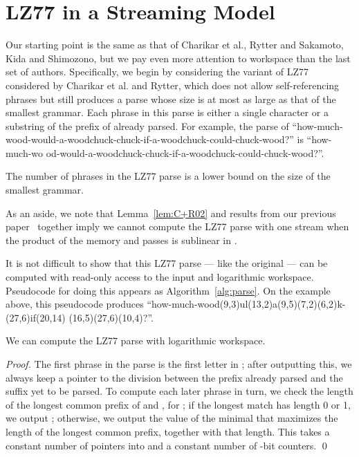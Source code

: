 \documentclass[runningheads]{llncs}
\begin{document}
\section{LZ77 in a Streaming Model} \label{sec:LZ77}

Our starting point is the same as that of Charikar et al., Rytter and Sakamoto, Kida and Shimozono, but we pay even more attention to workspace than the last set of authors.  Specifically, we begin by considering the variant of LZ77 considered by Charikar et al. and Rytter, which does not allow self-referencing phrases but still produces a parse whose size is at most as large as that of the smallest grammar.  Each phrase in this parse is either a single character or a substring of the prefix of  already parsed.  For example, the parse of ``{\sf how-much-wood-would-a-woodchuck-chuck-if-a-woodchuck-could-chuck-wood?}'' is ``{\sf how-much-wo
\linebreak
od-would-a-woodchuck-chuck-if-a-woodchuck-could-chuck-wood?}''.

\begin{lemma} \label{lem:C+R02}
The number of phrases in the LZ77 parse is a lower bound on the size of the smallest grammar.
\end{lemma}

\noindent As an aside, we note that Lemma~\ref{lem:C+R02} and results from our previous paper~\cite{Gag09} together imply we cannot compute the LZ77 parse with one stream when the product of the memory and passes is sublinear in .

It is not difficult to show that this LZ77 parse --- like the original --- can be computed with read-only access to the input and logarithmic workspace.  Pseudocode for doing this appears as Algorithm~\ref{alg:parse}.  On the example above, this pseudocode produces ``{\sf how-much-wood(9,3)ul(13,2)a(9,5)(7,2)(6,2)k-(27,6)if(20,14)
\linebreak
(16,5)(27,6)(10,4)?}''.

\begin{lemma} \label{lem:lz77}
We can compute the LZ77 parse with logarithmic workspace.
\end{lemma}

\begin{proof}
The first phrase in the parse is the first letter in ; after outputting this, we always keep a pointer  to the division between the prefix already parsed and the suffix yet to be parsed.  To compute each later phrase in turn, we check the length of the longest common prefix of  and , for ; if the longest match has length 0 or 1, we output ; otherwise, we output the value of the minimal  that maximizes the length of the longest common prefix, together with that length.  This takes a constant number of pointers into  and a constant number of -bit counters. \qed
\end{proof}
\end{document}
